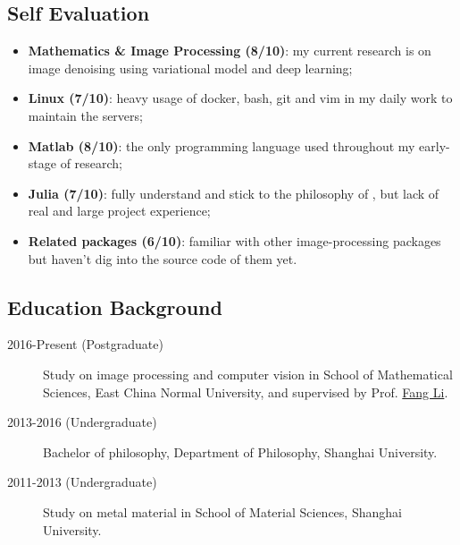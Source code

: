 \subsection*{Self Evaluation}
\begin{itemize}
    \item \textbf{Mathematics \& Image Processing (8/10)}: my current research is on image denoising using variational model and deep learning;
    \item \textbf{Linux (7/10)}: heavy usage of docker, bash, git and vim in my daily work to maintain the servers;
    \item \textbf{Matlab (8/10)}: the only programming language used throughout my early-stage of research;
    \item \textbf{Julia (7/10)}: fully understand and stick to the philosophy of \langjulia, but lack of real and large project experience;
    \item \textbf{Related packages (6/10)}: familiar with other image-processing packages but haven't dig into the source code of them yet.
\end{itemize}

\subsection*{Education Background}

\begin{description}
    \item[2016-Present (Postgraduate)]Study on image processing and computer vision in School of Mathematical Sciences, East China Normal University, and supervised by Prof. \href{http://math.ecnu.edu.cn/~fli/}{\textsf{Fang Li}}.
    \item[2013-2016 (Undergraduate)] Bachelor of philosophy, Department of Philosophy, Shanghai University.
    \item[2011-2013 (Undergraduate)] Study on metal material in School of Material Sciences, Shanghai University.
\end{description}
